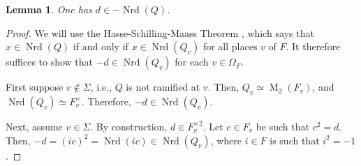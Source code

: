 \documentclass[11pt,letterpaper]{amsart}
\theoremstyle{plain}
\newtheorem{lemma}[theorem]{Lemma}
\theoremstyle{definition}
\theoremstyle{remark}
\begin{document}
\begin{lemma}\label{neg-norm}
    One has $d\in -\operatorname{Nrd}(Q)$.
\end{lemma}
\begin{proof}
    We will use the Hasse-Schilling-Maass Theorem \cite[Theorem 33.15]{reiner2003maximal}, which says that $x\in\operatorname{Nrd}(Q)$ if and only if $x\in\operatorname{Nrd}(Q_v)$ for all places $v$ of $F$. It therefore suffices to show that $-d\in\operatorname{Nrd}(Q_v)$ for each $v\in\Omega_F$.

   First suppose $v\notin \Sigma$, i.e., $Q$ is not ramified at $v$. Then, $Q_v\simeq \operatorname{M}_2(F_v)$, and $\operatorname{Nrd}(Q_v)\simeq F_v^\times$. Therefore, $-d\in\operatorname{Nrd}(Q_v)$.

   Next, assume $v\in \Sigma$. By construction, $d\in F_v^{\times 2}$. Let $c\in F_v$ be such that $c^2 = d$. Then, $-d = (ic)^2 = \operatorname{Nrd}(ic)\in\operatorname{Nrd}(Q_v)$, where $i\in F$ is such that $i^2 = -1$.
\end{proof}
\end{document}
